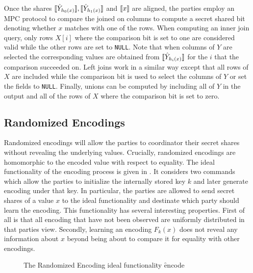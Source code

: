 Once the shares  $\llbracket \hat Y_{h_0(x)}\rrbracket, \llbracket \hat Y_{h_1(x)}\rrbracket$ and $\llbracket x\rrbracket$ are aligned, the parties employ an MPC protocol to compare the joined on columns to compute a secret shared bit denoting whether $x$ matches with one of the rows. When computing an inner join query, only rows $X[i]$ where the comparison bit is set to one are considered valid while the other rows are set to \texttt{NULL}. Note that when columns of $Y$ are selected the corresponding values are obtained from $\llbracket \hat Y_{h_i(x)}\rrbracket$ for the $i$ that the comparison succeeded on. Left joins work in a similar way except that all rows of $X$ are included while the comparison bit is used to select the columns of $Y$ or set the fields to \texttt{NULL}. Finally, unions can be computed by including all of $Y$ in the output and all of the rows of $X$ where the comparison bit is set to zero.

\subsection{Randomized Encodings}

Randomized encodings will allow the parties to coordinator their secret shares without revealing the underlying values. Crucially, randomized encodings are homomorphic to the encoded value with respect to equality. The ideal functionality of the encoding process is given in . It considers two commands which allow the parties to initialize the internally stored key $k$ and later generate encoding under that key. In particular, the parties are allowed to send secret shares of a value $x$  to the ideal functionality and destinate which party should learn the encoding. This functionality has several interesting properties. First of all is that all encoding that have not been observed are uniformly distributed in that parties view. Secondly, learning an encoding $F_k(x)$ does not reveal any information about $x$ beyond being about to compare it for equality with other encodings. 

\begin{figure}[ht]
	\caption{The Randomized Encoding ideal functionality \f{encode}}
	\label{fig:randomized-encode-ideal}	
\end{figure}


